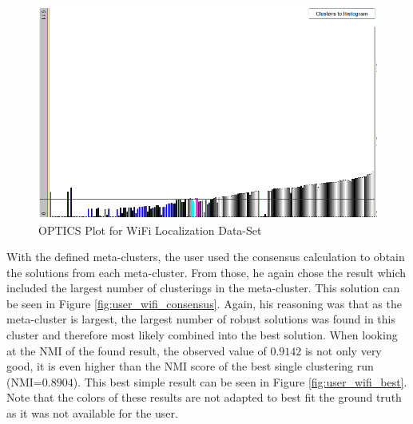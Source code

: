 \documentclass[
	a4paper,
	english,
	twoside,
	openright,               
	11pt                            
	]{report}
\begin{document}
\begin{figure}[h]
	\centering
	\includegraphics[scale=.5]{user_wifi_optics}
	\caption{OPTICS Plot for WiFi Localization Data-Set}
	\label{fig:user_wifi_optics}
\end{figure}

With the defined meta-clusters, the user used the consensus calculation to obtain the solutions from each meta-cluster. From those, he again chose the result which included the largest number of clusterings in the meta-cluster. This solution can be seen in Figure \ref{fig:user_wifi_consensus}. Again, his reasoning was that as the meta-cluster is largest, the largest number of robust solutions was found in this cluster and therefore most likely combined into the best solution. When looking at the NMI of the found result, the observed value of $0.9142$ is not only very good, it is even higher than the NMI score of the best single clustering run (NMI=$0.8904$). This best simple result can be seen in Figure \ref{fig:user_wifi_best}. Note that the colors of these results are not adapted to best fit the ground truth as it was not available for the user.
\end{document}
